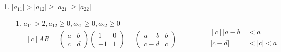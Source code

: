 \documentclass{article}
\newcommand\tab[1][0.6cm]{\hspace*{#1}}
\newcommand\nl{\newline\tab}
\begin{document}
	\begin{enumerate}
		\item  
		$|a_{11}| > |a_{12}| \geq |a_{21}| \geq |a_{22}|  $ \nl
		
		\begin{enumerate}
			\item $a_{11} > 2, a_{12} \geq 0, a_{21} \geq 0, a_{22} \geq 0$ \nl
			$$
			\begin{aligned}[c]
			AR = 
			\begin{pmatrix}
			a & b \\
			c & d 
			\end{pmatrix} 
			\begin{pmatrix}
			1 & 0 \\
			-1 & 1 
			\end{pmatrix} = 
			\begin{pmatrix}
			a-b & b \\
			c-d & c 
			\end{pmatrix}
			\end{aligned}
			\qquad\qquad
			\begin{aligned}[c]
			|a - b| &< a\\
			|c - d| &< |c| < a\\
			\end{aligned}
			$$
		\end{enumerate}
		
	\end{enumerate}
	
	
	
\end{document}
